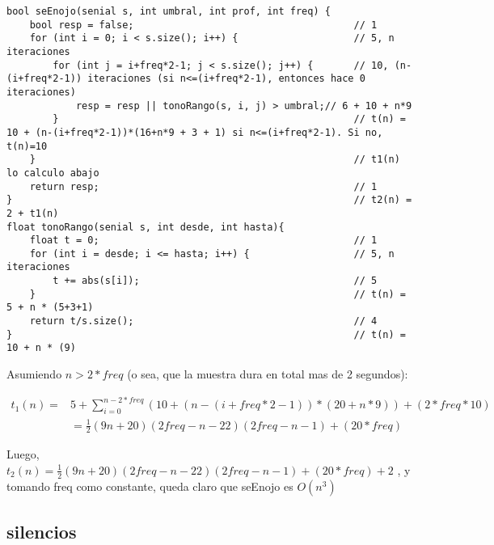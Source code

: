 \documentclass{article}
\begin{document}
\begin{lstlisting}
bool seEnojo(senial s, int umbral, int prof, int freq) {
    bool resp = false;                                      // 1
    for (int i = 0; i < s.size(); i++) {                    // 5, n iteraciones
        for (int j = i+freq*2-1; j < s.size(); j++) {       // 10, (n-(i+freq*2-1)) iteraciones (si n<=(i+freq*2-1), entonces hace 0 iteraciones)
            resp = resp || tonoRango(s, i, j) > umbral;// 6 + 10 + n*9
        }                                                   // t(n) = 10 + (n-(i+freq*2-1))*(16+n*9 + 3 + 1) si n<=(i+freq*2-1). Si no, t(n)=10
    }                                                       // t1(n) lo calculo abajo
    return resp;                                            // 1
}                                                           // t2(n) = 2 + t1(n)
float tonoRango(senial s, int desde, int hasta){
    float t = 0;                                            // 1
    for (int i = desde; i <= hasta; i++) {                  // 5, n iteraciones
        t += abs(s[i]);                                     // 5
    }                                                       // t(n) = 5 + n * (5+3+1)
    return t/s.size();                                      // 4
}                                                           // t(n) = 10 + n * (9)
\end{lstlisting}

Asumiendo $n > 2*freq$ (o sea, que la muestra dura en total mas de 2 segundos):

\begin{equation*}
\begin{split}
t_1(n) ={} & 5 + \sum_{i=0}^{n-2*freq}(10 + (n-(i+freq*2-1))*(20+n*9)) + (2*freq * 10)\\
      & = \frac{1}{2} (9 n + 20) (2 freq - n - 22) (2 freq - n - 1) + (20*freq)
\end{split}
\end{equation*}

Luego,
$t_2(n) = \frac{1}{2} (9 n + 20) (2 freq - n - 22) (2 freq - n - 1) + (20*freq) + 2$
, y tomando freq como constante, queda claro que seEnojo es $O(n^3)$

\newpage
\subsection{silencios}
\end{document}
